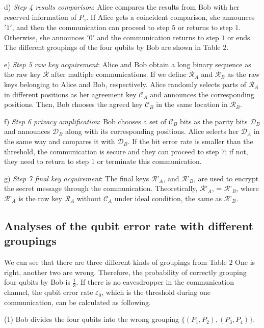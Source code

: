 \documentclass[a4paper,11pt]{article}
\begin{document}
d) \textit{Step 4 results comparison}: Alice compares the results from Bob with her reserved information of $P_\gamma$. If Alice gets a coincident comparison, she announces $'1'$, and then the communication can proceed to step $5$ or returns to step $1$. Otherwise, she announces $'0'$ and the communication returns to step $1$ or ends. The different groupings of the four qubits by Bob are shown in Table $2$.

e) \textit{Step 5 raw key acquirement}: Alice and Bob obtain a long binary sequence as the raw key $\mathcal{R}$ after multiple communications. If we define $\mathcal{R}_A$ and $\mathcal{R}_B$ as the raw keys belonging to Alice and Bob, respectively. Alice randomly selects parts of $\mathcal{R}_A$ in different positions as her agreement key $\mathcal{C}_A$ and announces the corresponding positions. Then, Bob chooses the agreed key $\mathcal{C}_B$ in the same location in $\mathcal{R}_B$.

f) \textit{Step 6 privacy amplification}: Bob chooses a set of $\mathcal{C}_B$ bits as the parity bits $\mathcal{D}_B$ and announces $\mathcal{D}_B$ along with its corresponding positions. Alice selects her $\mathcal{D}_A$ in the same way and compares it with $\mathcal{D}_B$. If the bit error rate is smaller than the threshold, the communication is secure and they can proceed to step $7$; if not, they need to return to step $1$ or terminate this communication.

g) \textit{Step 7 final key acquirement}: The final keys $\mathcal{R}’_A$, and $\mathcal{R}’_B$, are used to encrypt the secret message through the communication. Theoretically, $\mathcal{R}’_A$, = $\mathcal{R}’_B$, where $\mathcal{R}’_A$ is the raw key $\mathcal{R}_A$ without $\mathcal{C}_A$ under ideal condition, the same as $\mathcal{R}’_B$.

\subsection{Analyses of the qubit error rate with different groupings}

We can see that there are three different kinds of groupings from Table $2$ One is right, another two are wrong. Therefore, the probability of correctly grouping four qubits by Bob is $\frac{1}{3}$. If there is no eavesdropper in the communication channel, the qubit error rate $\varepsilon_0$, which is the threshold during one communication, can be calculated as following.

(1) Bob divides the four qubits into the wrong grouping $\{(P_1 , P_2), (P_3 , P_4)\}$.
\end{document}
